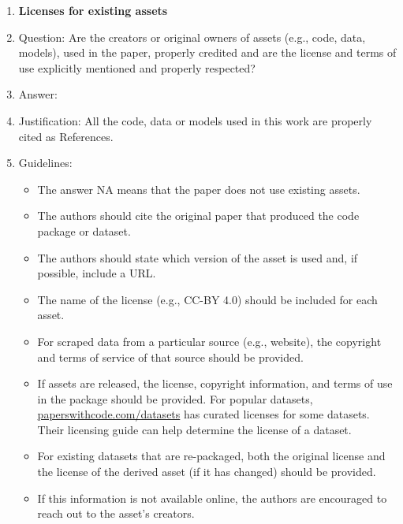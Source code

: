 \begin{enumerate}
\item {\bf Licenses for existing assets}
    \item[] Question: Are the creators or original owners of assets (e.g., code, data, models), used in the paper, properly credited and are the license and terms of use explicitly mentioned and properly respected?
    \item[] Answer: \answerYes{} %
    \item[] Justification: All the code, data or models used in this work are properly cited as References.
    \item[] Guidelines:
    \begin{itemize}
        \item The answer NA means that the paper does not use existing assets.
        \item The authors should cite the original paper that produced the code package or dataset.
        \item The authors should state which version of the asset is used and, if possible, include a URL.
        \item The name of the license (e.g., CC-BY 4.0) should be included for each asset.
        \item For scraped data from a particular source (e.g., website), the copyright and terms of service of that source should be provided.
        \item If assets are released, the license, copyright information, and terms of use in the package should be provided. For popular datasets, \url{paperswithcode.com/datasets} has curated licenses for some datasets. Their licensing guide can help determine the license of a dataset.
        \item For existing datasets that are re-packaged, both the original license and the license of the derived asset (if it has changed) should be provided.
        \item If this information is not available online, the authors are encouraged to reach out to the asset's creators.
    \end{itemize}


\end{enumerate}

